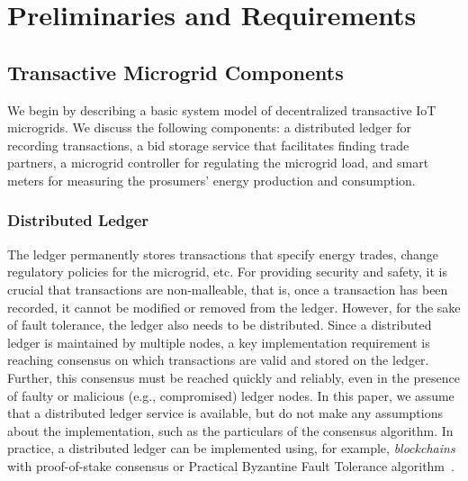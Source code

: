 \section{Preliminaries and Requirements}

\subsection{Transactive Microgrid Components}

We begin by describing a basic system model of decentralized transactive IoT microgrids.
We discuss the following components: a distributed ledger for recording transactions, a bid storage service that facilitates finding trade partners, a microgrid controller for regulating the microgrid load, and smart meters for measuring the prosumers' energy production and consumption.

\subsubsection{Distributed Ledger}
The ledger permanently stores transactions that specify energy trades, change regulatory policies for the microgrid, etc.
For providing security and safety, it is crucial that transactions are non-malleable, that is, once a transaction has been recorded, it cannot be modified or removed from the ledger.
However, for the sake of fault tolerance, the ledger also needs to be distributed.
Since a distributed ledger is maintained by multiple nodes, a key implementation requirement is reaching consensus on which transactions are valid and stored on the ledger.
Further, this consensus must be reached quickly and reliably, even in the presence of faulty or malicious (e.g., compromised) ledger nodes.
In this paper, we assume that a distributed ledger service is available, but do not make any assumptions about the implementation, such as the particulars of the consensus algorithm.
In practice, a distributed ledger can be implemented using, for example, \emph{blockchains} with proof-of-stake consensus or Practical Byzantine Fault Tolerance algorithm~\cite{castro1999practical}.

